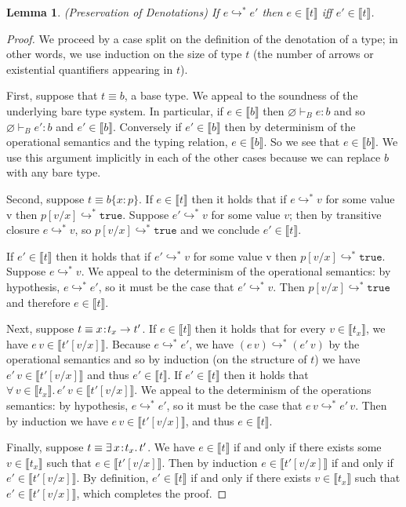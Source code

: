 \documentclass[11pt]{article}
\newtheorem{lemma}[theorem]{Lemma}
\newcommand{\bind}{\hspace{0.1em}{:}\hspace{0.1em}} %
\newcommand{\col}{\mathbin{:}}       %
\newcommand{\lb}{\llbracket}         %
\newcommand{\rb}{\rrbracket}         %
\newcommand{\many}{\hookrightarrow^*}
\newcommand{\true}{\mathtt{true}}
\begin{document}
\begin{lemma}{(Preservation of Denotations)
If $e \hookrightarrow^* e'$ then $e \in \lb t\rb$ iff $e' \in \lb t\rb$.}\label{pres-den}
\end{lemma}
\begin{proof}
We proceed by a case split on the definition of the denotation of a type; in other words, we use induction on the size of type $t$ (the number of arrows or existential quantifiers appearing in $t$).

First, suppose that $t \equiv b$, a base type. We appeal to the soundness of the underlying bare type system. In particular, if
$e \in \lb b \rb$ then $\varnothing \vdash_B e : b$ and so $\varnothing \vdash_B e' : b$ and $e' \in \lb b \rb$.
Conversely if $e' \in \lb b \rb$ then by determinism of the operational semantics and the typing relation, $e \in \lb b \rb$. So we see that $e \in \lb b\rb$. We use this argument implicitly in each of the other cases because we can replace $b$ with any bare type.

Second, suppose $t \equiv b\{x\col p\}$.
If $e \in \lb t\rb$ then it holds that 
if $e \many v$ for some value v then $p[v/x] \many \true$.
Suppose $e' \many v$ for some value $v$; then by transitive closure $e \many v$, so $p[v/x] \many \true$ and we conclude $e' \in \lb t \rb$.

If $e' \in \lb t\rb$ then it holds that %
if $e' \many v$ for some value v then $p[v/x] \many \true$. Suppose $e \many v$. We appeal to the determinism of the operational semantics: by hypothesis, $e \many e'$, so it must be the case that $e' \many v$. Then $p[v/x] \many \true$ and %
therefore $e \in \lb t \rb$.

Next, suppose $t \equiv x\bind t_x \rightarrow t'$.
If $e \in \lb t\rb$ then it holds that %
for every $v \in \lb t_x \rb$, we have $e\, v \in \lb t'[v/x]\rb$.
Because $e \many e'$, we have $(e\, v) \many (e'\, v)$ by the operational semantics and so by induction (on the structure of  $t$) we have $e'\, v \in \lb t'[v/x]\rb$ and thus $e' \in \lb t\rb$.
If $e' \in \lb t\rb$ then it holds that %
$\forall\, v \in \lb t_x \rb.\, e'\, v \in \lb t'[v/x]\rb$.
We appeal to the determinism of the operations semantics: by hypothesis, $e \many e'$, so it must be the case that $e\, v \many e'\, v$. Then by induction we have $e\, v \in \lb t'[v/x]\rb$, and thus $e\in\lb t\rb$.

Finally, suppose $t \equiv \exists\, x\bind t_x.\, t'$. We have $e \in \lb t \rb$ if and only if there exists some $v \in \lb t_x \rb$ such that 
$e \in \lb t'[v/x]\rb$. Then by induction $e \in \lb t'[v/x]\rb$ if and only if $e' \in \lb t'[v/x]\rb$. By definition, $e' \in \lb t\rb$ if and only if there exists $v \in \lb t_x\rb$ such that $e'\in\lb t'[v/x]\rb$, which completes the proof.
\end{proof}
\end{document}
